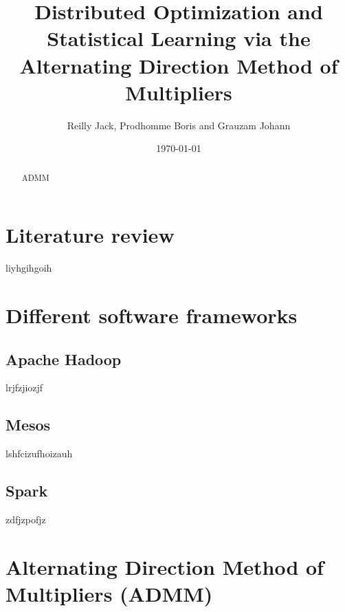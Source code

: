 \documentclass{article}
\begin{document}
\pagestyle{fancy}
\lfoot{}
\rfoot{\thepage}
\cfoot{}
\chead{}
\rhead{} 
\lhead{}

\title{Distributed Optimization and Statistical Learning via the Alternating Direction Method of Multipliers}       
\author{Reilly Jack, Prodhomme Boris and Grauzam Johann\\ }       
\date{\today}         
\maketitle

\begin{abstract}

	ADMM \cite{ref1}
	
\end{abstract}

\section{Literature review}
 \label{Literature review}
 
	liyhgihgoih

\section{Different software frameworks}
 \label{Different software frameworks}

\subsection{Apache Hadoop}
	\label{Apache Hadoop}
	
	lrjfzjiozjf
	
\subsection{Mesos}
	\label{Mesos}
	
	lshfcizufhoizauh	
	
\subsection{Spark}
	\label{Spark}
	
	zdfjzpofjz


\section{Alternating Direction Method of Multipliers (ADMM)}
	\label{Alternating Direction Method of Multipliers (ADMM)}
	
\end{document}
